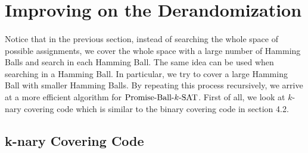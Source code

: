 \documentclass[a4paper,12pts]{article}
\newcommand{\SAT}{\textnormal{$k$-SAT}}
\newcommand{\PBS}{\textnormal{Promise-Ball-$\SAT$}}
\begin{document}
\section{Improving on the Derandomization\cite{Moser11}}
\paragraph{} Notice that in the previous section, instead of searching the whole space of possible assignments, we cover the whole space with a large number of Hamming Balls and search in each Hamming Ball. The same idea can be used when searching in a Hamming Ball. In particular, we try to cover a large Hamming Ball with smaller Hamming Balls. By repeating this process recursively, we arrive at a more efficient algorithm for $\PBS$. First of all, we look at $k$-nary covering code which is similar to the binary covering code in section 4.2.
\subsection{k-nary Covering Code}
\end{document}
